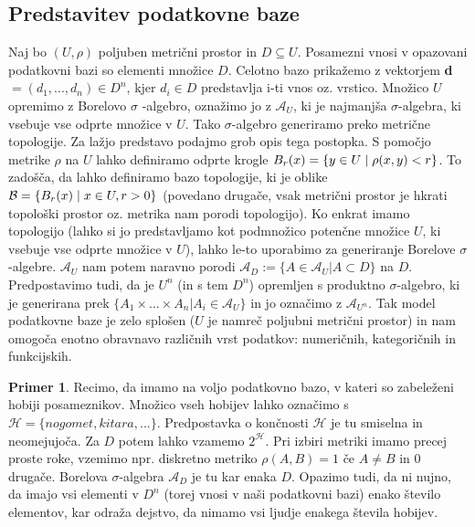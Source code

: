 \documentclass[12pt,a4paper]{amsart}
\theoremstyle{definition} %
\newtheorem{primer}[definicija]{Primer}
\theoremstyle{plain} %
\begin{document}
\subsection{Predstavitev podatkovne baze}
Naj bo $(U, \rho)$ poljuben metrični prostor in $D \subseteq U$. Posamezni vnosi v opazovani podatkovni bazi so elementi množice $D$. Celotno bazo prikažemo z vektorjem \textbf{d} $= (d_{1}, ..., d_{n}) \in D^n$, kjer $d_{i} \in D$ predstavlja i-ti vnos oz. vrstico. 
\newline
\newline
Množico $U$ opremimo z Borelovo $\sigma$ -algebro, oznažimo jo z $\mathcal{A}_{U}$, ki je najmanjša $\sigma$-algebra, ki vsebuje vse odprte množice v $U$. Tako $\sigma$-algebro generiramo preko metrične topologije. Za lažjo predstavo podajmo grob opis tega postopka. S pomočjo metrike $\rho$ na $U$ lahko definiramo odprte krogle  $B_{r}(x) = \{y \in U\hspace{0.1cm}|\hspace{0.1cm}\rho(x,y) < r\}$. To zadošča, da lahko definiramo bazo topologije, ki je oblike $\mathcal{B} = \{B_{r}(x)\hspace{0.1cm}|\hspace{0.1cm}x \in U, r>0\}$ (povedano drugače, vsak metrični prostor je hkrati topološki prostor oz. metrika nam porodi topologijo). Ko enkrat imamo topologijo  (lahko si jo predstavljamo kot podmnožico potenčne množice $U$, ki vsebuje vse odprte množice v $U$), lahko le-to uporabimo za generiranje Borelove $\sigma$-algebre.
\newline
\newline
$\mathcal{A}_{U}$ nam potem naravno porodi $\mathcal{A}_{D} := \{A \in \mathcal{A}_{U} | A \subset D \}$ na $D$. Predpostavimo tudi, da je $U^n$ (in s tem $D^n$) opremljen s produktno $\sigma$-algebro, ki je generirana prek $\{A_{1} \times ... \times A_{n} | A_{i} \in \mathcal{A}_{U}\}$ in jo označimo z $\mathcal{A}_{U^n}$. 
\newline
\newline
Tak model podatkovne baze je zelo splošen ($U$ je namreč poljubni metrični prostor) in nam omogoča enotno obravnavo različnih vrst podatkov: numeričnih, kategoričnih in funkcijskih.
\begin{primer}  
Recimo, da imamo na voljo podatkovno bazo, v kateri so zabeleženi hobiji posameznikov. Množico vseh hobijev lahko označimo s $\mathcal{H}=\{nogomet, kitara,...\}$. Predpostavka o končnosti $\mathcal{H}$ je tu smiselna in neomejujoča. Za $D$ potem lahko vzamemo $2^\mathcal{H}$. Pri izbiri metriki imamo precej proste roke, vzemimo npr. diskretno metriko  $\rho(A,B)=1$ če $A \neq B$ in 0 drugače. Borelova $\sigma$-algebra $\mathcal{A}_{D}$ je tu kar enaka $D$. Opazimo tudi, da ni nujno, da imajo vsi elementi v $D^n$ (torej vnosi v naši podatkovni bazi) enako število elementov, kar odraža dejstvo, da nimamo vsi ljudje enakega števila hobijev.
\end{primer}
\end{document}
